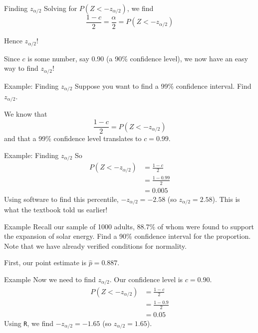 \begin{frame}{Finding $z_{\alpha/2}$}
    Solving for $P(Z < -z_{\alpha/2})$, we find
    \[
    \frac{1-c}{2} = \frac{\alpha}{2} = P(Z < -z_{\alpha/2})
    \]
    
    Hence $z_{\alpha/2}$!
    
    \vspace{12pt}Since $c$ is some number, say 0.90 (a 90\% confidence level), we now have an easy way to find $z_{\alpha/2}$!
\end{frame}

\begin{frame}{Example: Finding $z_{\alpha/2}$}
    Suppose you want to find a 99\% confidence interval. Find $z_{\alpha/2}$.
    
    \vspace{12pt}We know that
    \[
    \frac{1-c}{2} = P(Z < -z_{\alpha/2})
    \]
    and that a 99\% confidence level translates to $c=0.99$.
\end{frame}

\begin{frame}{Example: Finding $z_{\alpha/2}$}
    So
    \begin{align*}
        P(Z < -z_{\alpha/2}) &= \frac{1-c}{2} \\
        &= \frac{1-0.99}{2}  \\
        &= 0.005
    \end{align*}
    Using software to find this percentile, $-z_{\alpha/2}=-2.58$ (so $z_{\alpha/2} = 2.58$). This is what the textbook told us earlier!
\end{frame}

\begin{frame}{Example}
    Recall our sample of 1000 adults, 88.7\% of whom were found to support the expansion of solar energy. Find a 90\% confidence interval for the proportion. Note that we have already verified conditions for normality.
    
    \vspace{12pt}First, our point estimate is $\hat{p}=0.887$.
\end{frame}

\begin{frame}{Example}
    Now we need to find $z_{\alpha/2}$. Our confidence level is $c=0.90$.
    \begin{align*}
        P(Z < -z_{\alpha/2}) &= \frac{1-c}{2} \\
        &= \frac{1-0.9}{2} \\
        &= 0.05
    \end{align*}
    Using \texttt{R}, we find $-z_{\alpha/2} = -1.65$ (so $z_{\alpha/2}=1.65$). 
\end{frame}

